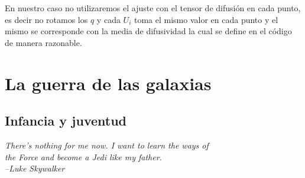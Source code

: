 \documentclass[11pt,a4paper,twoside]{tesis}
\begin{document}
En nuestro caso no utilizaremos el ajuste con el tensor de difusi\'on en cada punto, es decir 
no rotamos los $q$ y cada $U_i$ toma el mismo valor en cada punto y el mismo se corresponde con la 
media de difusividad la cual se define en el c\'odigo de manera razonable.
























\chapter{La guerra de las galaxias}
\section{Infancia y juventud}
{\begin{small}%
\begin{flushright}%
\it
There's nothing for me now.
I want to learn the ways of\\ the Force and become a Jedi like my father. \\
--Luke Skywalker
\end{flushright}%
\end{small}%
\vspace{.5cm}}
\end{document}
